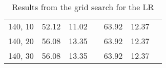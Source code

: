 \documentclass[12pt,a4paper]{article}
\begin{document}
\begin{table}[]
\begin{tabular}{ccccccc}
140, 10                                           & 52.12                                                    & 11.02    &                                                             & 63.92                                                   & 12.37    &                                                             \\
140, 20                                           & 56.08                                                    & 13.35    &                                                             & 63.92                                                   & 12.37    &                                                             \\
140, 30                                           & 56.08                                                    & 13.35    &                                                             & 63.92                                                   & 12.37    &                                                             \\ \hline
\end{tabular}
\caption{Results from the grid search for the LR}
\label{tab:GridLoc}
\end{table}
\end{document}

